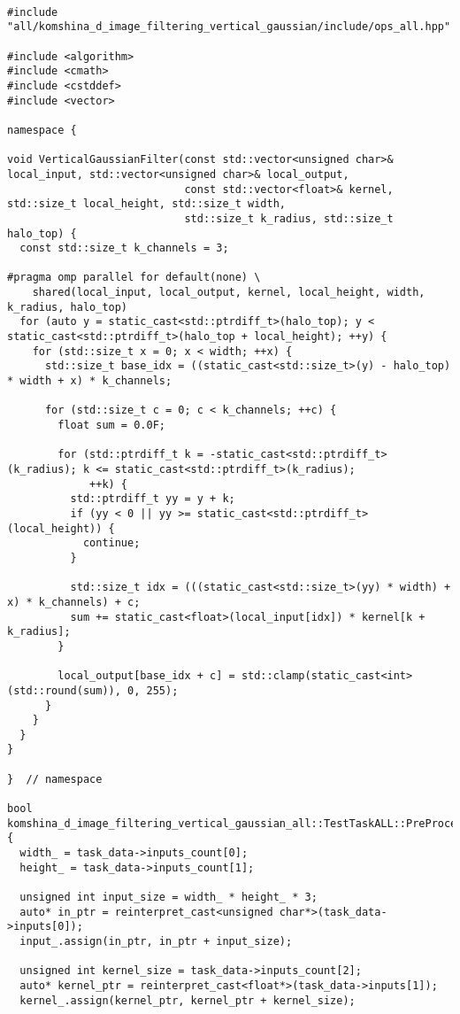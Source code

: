 \documentclass[12pt]{article}
\begin{document}
\begin{lstlisting}

#include "all/komshina_d_image_filtering_vertical_gaussian/include/ops_all.hpp"

#include <algorithm>
#include <cmath>
#include <cstddef>
#include <vector>

namespace {

void VerticalGaussianFilter(const std::vector<unsigned char>& local_input, std::vector<unsigned char>& local_output,
                            const std::vector<float>& kernel, std::size_t local_height, std::size_t width,
                            std::size_t k_radius, std::size_t halo_top) {
  const std::size_t k_channels = 3;

#pragma omp parallel for default(none) \
    shared(local_input, local_output, kernel, local_height, width, k_radius, halo_top)
  for (auto y = static_cast<std::ptrdiff_t>(halo_top); y < static_cast<std::ptrdiff_t>(halo_top + local_height); ++y) {
    for (std::size_t x = 0; x < width; ++x) {
      std::size_t base_idx = ((static_cast<std::size_t>(y) - halo_top) * width + x) * k_channels;

      for (std::size_t c = 0; c < k_channels; ++c) {
        float sum = 0.0F;

        for (std::ptrdiff_t k = -static_cast<std::ptrdiff_t>(k_radius); k <= static_cast<std::ptrdiff_t>(k_radius);
             ++k) {
          std::ptrdiff_t yy = y + k;
          if (yy < 0 || yy >= static_cast<std::ptrdiff_t>(local_height)) {
            continue;
          }

          std::size_t idx = (((static_cast<std::size_t>(yy) * width) + x) * k_channels) + c;
          sum += static_cast<float>(local_input[idx]) * kernel[k + k_radius];
        }

        local_output[base_idx + c] = std::clamp(static_cast<int>(std::round(sum)), 0, 255);
      }
    }
  }
}

}  // namespace

bool komshina_d_image_filtering_vertical_gaussian_all::TestTaskALL::PreProcessingImpl() {
  width_ = task_data->inputs_count[0];
  height_ = task_data->inputs_count[1];

  unsigned int input_size = width_ * height_ * 3;
  auto* in_ptr = reinterpret_cast<unsigned char*>(task_data->inputs[0]);
  input_.assign(in_ptr, in_ptr + input_size);

  unsigned int kernel_size = task_data->inputs_count[2];
  auto* kernel_ptr = reinterpret_cast<float*>(task_data->inputs[1]);
  kernel_.assign(kernel_ptr, kernel_ptr + kernel_size);


\end{lstlisting}
\end{document}
